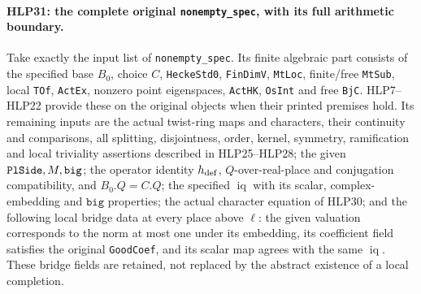 \paragraph{HLP31: the complete original \texttt{nonempty\_\allowbreak spec}, with its full arithmetic boundary.}
\label{claim:HLP31}
Take exactly the input list of \texttt{nonempty\_\allowbreak spec}. Its
finite algebraic part consists of the specified base \(B_0\),
choice \(C\), \texttt{Hecke\allowbreak Std0}, \texttt{Fin\allowbreak Dim\allowbreak V}, \texttt{Mt\allowbreak Loc},
finite/free \texttt{Mt\allowbreak Sub}, local \texttt{TOf}, \texttt{Act\allowbreak Ex},
nonzero point eigenspaces, \texttt{Act\allowbreak HK}, \texttt{Os\allowbreak Int} and
free \texttt{Bj\allowbreak C}. HLP7--HLP22 provide these on the original
objects when their printed premises hold. Its remaining inputs
are the actual twist-ring maps and characters, their continuity
and comparisons, all splitting, disjointness, order, kernel,
symmetry, ramification and local triviality assertions described
in HLP25--HLP28; the given \(\texttt{Pl\allowbreak Side},M,\texttt{big}\);
the operator identity \(h_{\rm def}\), \(Q\)-over-real-place and
conjugation compatibility, and \(B_0.Q=C.Q\); the specified
\(\operatorname{iq}\) with its scalar, complex-embedding and
\(\texttt{big}\) properties; the actual character equation of
HLP30; and the following local bridge data at every place above
\(\ell\): the given valuation corresponds to the norm at most
one under its embedding, its coefficient field satisfies the
original \texttt{Good\allowbreak Coef}, and its scalar map agrees with the
same \(\operatorname{iq}\). These bridge fields are retained,
not replaced by the abstract existence of a local completion.

